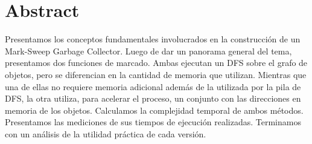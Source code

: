 \section{Abstract}

Presentamos los conceptos fundamentales involucrados en la construcción de un Mark-Sweep Garbage Collector. Luego de dar un panorama general del tema, presentamos dos funciones de marcado. Ambas ejecutan un DFS sobre el grafo de objetos, pero se diferencian en la cantidad de memoria que utilizan. Mientras que una de ellas no requiere memoria adicional además de la utilizada por la pila de DFS, la otra utiliza, para acelerar el proceso, un conjunto con las direcciones en memoria de los objetos. Calculamos la complejidad temporal de ambos métodos. Presentamos las mediciones de sus tiempos de ejecución realizadas. Terminamos con un análisis de la utilidad práctica de cada versión.